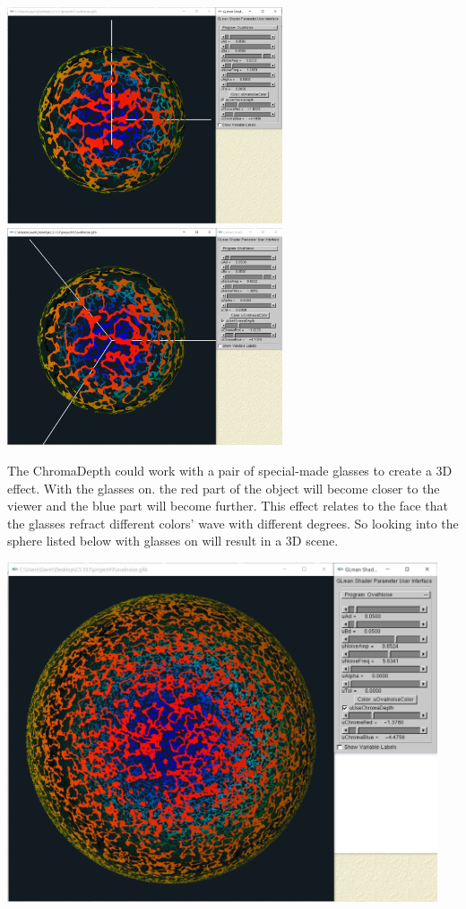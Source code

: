 \documentclass[letterpaper,14pt,titlepage,fleqn]{article}
\begin{document}
\begin{center}
	\includegraphics[width=3.2in]{E21.jpg}
	\includegraphics*[width=3.2in]{E22.jpg}
\end{center}
The ChromaDepth could work with a pair of special-made glasses to create a 3D effect. With the glasses on. the red part of the object will become closer to the viewer and the blue part will become further. This effect relates to the face that the glasses refract different colors' wave with different degrees. So looking into the sphere listed below with glasses on will result in a 3D scene.
\begin{center}
	\includegraphics[width=5in]{E23.jpg}
\end{center}
\end{document}
